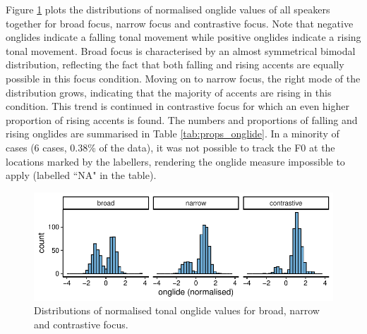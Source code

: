 Figure \ref{fig:onglide_distributions_within} plots the distributions of normalised onglide values of all speakers together for broad focus, narrow focus and contrastive focus. Note that negative onglides indicate a falling tonal movement while positive onglides indicate a rising tonal movement. Broad focus is characterised by an almost symmetrical bimodal distribution, reflecting the fact that both falling and rising accents are equally possible in this focus condition. Moving on to narrow focus, the right mode of the distribution grows, indicating that the majority of accents are rising in this condition. This trend is continued in contrastive focus for which an even higher proportion of rising accents is found. The numbers and proportions of falling and rising onglides are summarised in Table \ref{tab:props_onglide}. In a minority of cases (6 cases, 0.38\% of the data), it was not possible to track the F0 at the locations marked by the labellers, rendering the onglide measure impossible to apply (labelled ``NA" in the table).

\begin{figure}[!h]
	\includegraphics[width=.95\textwidth]{figures/ch6/onglide_norm_distribution_within.pdf}
	\caption{Distributions of normalised tonal onglide values for broad, narrow and contrastive focus.}
	\label{fig:onglide_distributions_within}
\end{figure}

